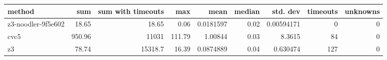 \begin{tabular}{lrrrrrrrr}
\hline
 method             &    sum &   sum with timeouts &    max &      mean &   median &   std. dev &   timeouts &   unknowns \\
\hline
 z3-noodler-9f5e602 &  18.65 &               18.65 &   0.06 & 0.0181597 &     0.02 & 0.00594171 &          0 &          0 \\
 cvc5               & 950.96 &            11031    & 111.79 & 1.00844   &     0.03 & 8.3615     &         84 &          0 \\
 z3                 &  78.74 &            15318.7  &  16.39 & 0.0874889 &     0.04 & 0.630474   &        127 &          0 \\
\hline
\end{tabular}
